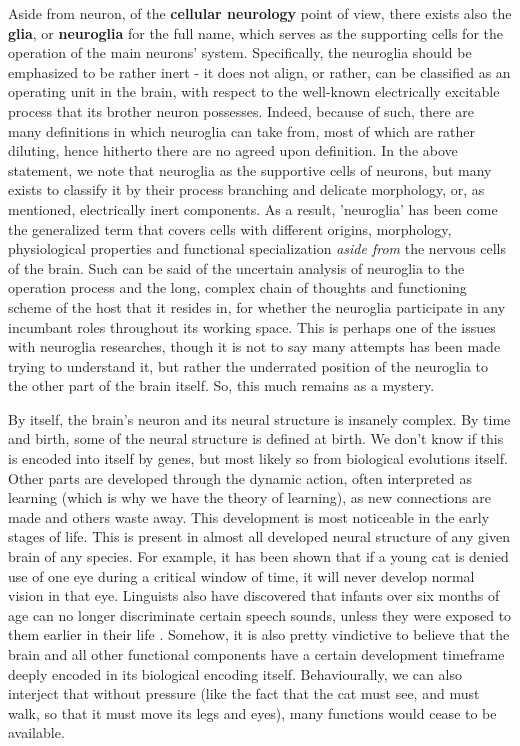 Aside from neuron, of the \textbf{cellular neurology} point of view, there exists also the \textbf{glia}, or \textbf{neuroglia} for the full name, which serves as the supporting cells for the operation of the main neurons' system. Specifically, the neuroglia should be emphasized to be rather inert - it does not align, or rather, can be classified as an operating unit in the brain, with respect to the well-known electrically excitable process that its brother neuron possesses. Indeed, because of such, there are many definitions in which neuroglia can take from, most of which are rather diluting, hence hitherto there are no agreed upon definition. In the above statement, we note that neuroglia as the supportive cells of neurons, but many exists to classify it by their process branching and delicate morphology, or, as mentioned, electrically inert components. As a result, 'neuroglia' has been come the generalized term that covers cells with different origins, morphology, physiological properties and functional specialization \textit{aside from} the nervous cells of the brain. Such can be said of the uncertain analysis of neuroglia to the operation process and the long, complex chain of thoughts and functioning scheme of the host that it resides in, for whether the neuroglia participate in any incumbant roles throughout its working space. This is perhaps one of the issues with neuroglia researches, though it is not to say many attempts has been made trying to understand it, but rather the underrated position of the neuroglia to the other part of the brain itself. So, this much remains as a mystery. 

By itself, the brain's neuron and its neural structure is insanely complex. By time and birth, some of the neural structure is defined at birth. We don't know if this is encoded into itself by genes, but most likely so from biological evolutions itself. Other parts are developed through the dynamic action, often interpreted as learning (which is why we have the theory of learning), as new connections are made and others waste away. This development is most noticeable in the early stages of life. This is present in almost all developed neural structure of any given brain of any species. For example, it has been shown that if a young cat is denied use of one eye during a critical window of time, it will never develop normal vision in that eye. Linguists also have discovered that infants over six months of age can no longer discriminate certain speech sounds, unless they were exposed to them earlier in their life \cite{WERKER198449}. Somehow, it is also pretty vindictive to believe that the brain and all other functional components have a certain development timeframe deeply encoded in its biological encoding itself. Behaviourally, we can also interject that without pressure (like the fact that the cat must see, and must walk, so that it must move its legs and eyes), many functions would cease to be available. 

